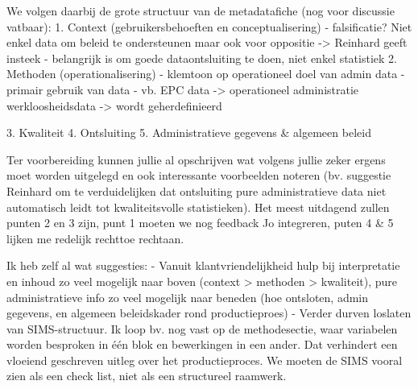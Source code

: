 We volgen daarbij de grote structuur van de metadatafiche (nog voor discussie vatbaar):
1.	Context (gebruikersbehoeften en conceptualisering)
  - falsificatie? Niet enkel data om beleid te ondersteunen maar ook voor oppositie -> Reinhard geeft insteek
  - belangrijk is om goede dataontsluiting te doen, niet enkel statistiek
2.	Methoden (operationalisering)
  - klemtoon op operationeel doel van admin data
  - primair gebruik van data
  - vb. EPC data -> operationeel administratie
  		werkloosheidsdata -> wordt geherdefinieerd
  
3.	Kwaliteit
4.	Ontsluiting
5.	Administratieve gegevens & algemeen beleid




Ter voorbereiding kunnen jullie al opschrijven wat volgens jullie zeker ergens moet worden uitgelegd en ook interessante voorbeelden noteren (bv. suggestie Reinhard om te verduidelijken dat ontsluiting pure administratieve data niet automatisch leidt tot kwaliteitsvolle statistieken). 
Het meest uitdagend zullen punten 2 en 3 zijn, punt 1 moeten we nog feedback Jo integreren, puten 4 & 5 lijken me redelijk rechttoe rechtaan.

Ik heb zelf al wat suggesties:
-	Vanuit klantvriendelijkheid hulp bij interpretatie en inhoud zo veel mogelijk naar boven (context > methoden > kwaliteit), pure administratieve info zo veel mogelijk naar beneden (hoe ontsloten, admin gegevens, en algemeen beleidskader rond productieproes)
-	Verder durven loslaten van SIMS-structuur. Ik loop bv. nog vast op de methodesectie, waar variabelen worden besproken in één blok en bewerkingen in een ander. Dat verhindert een vloeiend geschreven uitleg over het productieproces. We moeten de SIMS vooral zien als een check list, niet als een structureel raamwerk.
